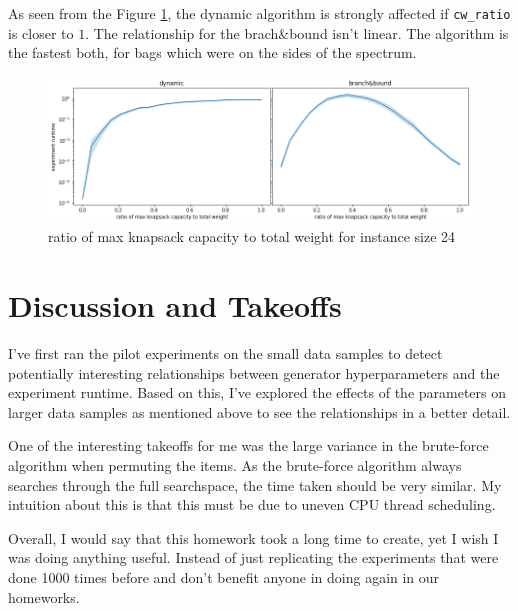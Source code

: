 \documentclass[a4paper,10pt]{article}
\begin{document}
As seen from the Figure \ref{cwratio_relation}, the dynamic algorithm is strongly affected if \lstinline{cw_ratio} is closer to $1$. The relationship for the brach\&bound isn't linear. The algorithm is the fastest both, for bags which were on the sides of the spectrum.

\begin{figure}[!htb]
	\centering
  	\includegraphics[width=\textwidth]{images/cwratio_fixed.png}
	\caption{ratio of max knapsack capacity to total weight for instance size 24}
	\label{cwratio_relation}
\end{figure}


\section{Discussion and Takeoffs}

I've first ran the pilot experiments on the small data samples to detect potentially interesting relationships between generator hyperparameters and the experiment runtime. Based on this, I've explored the effects of the parameters on larger data samples as mentioned above to see the relationships in a better detail.

One of the interesting takeoffs for me was the large variance in the brute-force algorithm when permuting the items. As the brute-force algorithm always searches through the full searchspace, the time taken should be very similar. My intuition about this is that this must be due to uneven CPU thread scheduling.

Overall, I would say that this homework took a long time to create, yet I wish I was doing anything useful. Instead of just replicating the experiments that were done 1000 times before and don't benefit anyone in doing again in our homeworks.
\end{document}

